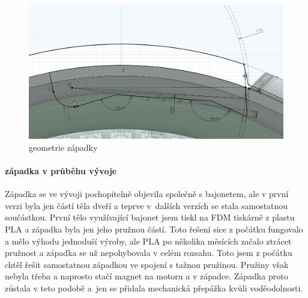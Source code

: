 \begin{figure}[htbp]
    \centering
    \includegraphics[width=\textwidth]{kapitoly/obrazky/E4/zapadka/uhel_cela.png}
    \caption{geometrie západky}
    \label{fig:E4-uhel_cela_zapadky}
\end{figure}

\newpage
\paragraph{západka v průběhu vývoje}

Západka se ve vývoji pochopitelně objevila společně s bajonetem, ale v první verzi byla jen částí těla dveří a teprve v~dalších verzích se stala
samostatnou součástkou. První tělo využívající bajonet jsem tiskl na FDM tiskárně z plastu PLA a západka byla jen jeho pružnou částí. Toto řešení sice 
z počátku fungovalo a mělo výhodu jednoduší výroby, ale PLA po několika měsících začalo ztrácet pružnost a západka se už nepohybovala v celém rozsahu.
Toto jsem z počátku chtěl řešit samostatnou západkou ve spojení s tažnou pružinou. Pružiny však nebyla třeba a naprosto stačí magnet na motoru a v západce.
Západka proto zůstala v teto podobě a~jen se přidala mechanická přepážka kvůli voděodolnosti. 


